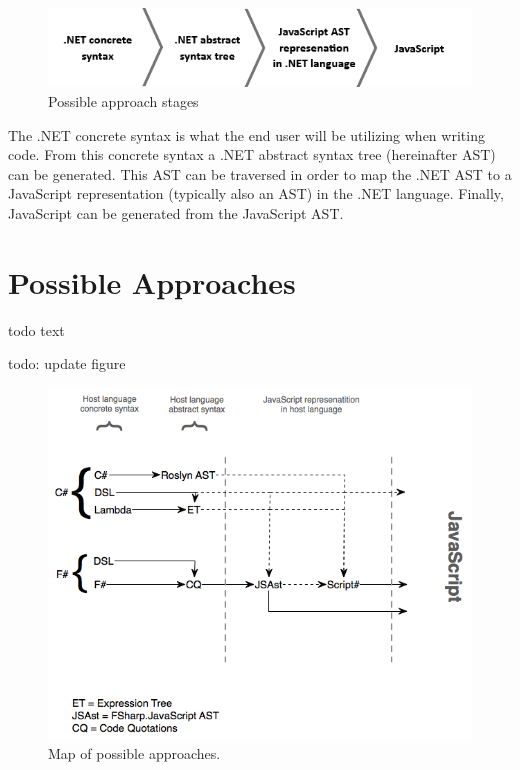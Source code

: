 				\begin{figure}[H]
			\begin{center}
				\centerline{\includegraphics[width=14cm]{resources/images/stages.png}}
			\end{center}
			\caption{Possible approach stages}
			\label{stages}
		\end{figure}

	The .NET concrete syntax is what the end user will be utilizing when writing code. From this concrete syntax a .NET abstract syntax tree (hereinafter AST) can be generated. This AST can be traversed in order to map the .NET AST to a JavaScript representation (typically also an AST) in the .NET language. Finally, JavaScript can be generated from the JavaScript AST.

\section{Possible Approaches} %
\label{sec:possible_approaches}
	todo text

	todo: update figure
					\begin{figure}[H]
			\begin{center}
				\centerline{\includegraphics[width=16cm]{resources/images/DSLv2.png}}
			\end{center}
			\caption{Map of possible approaches.}
			\label{approachMap}
		\end{figure}

